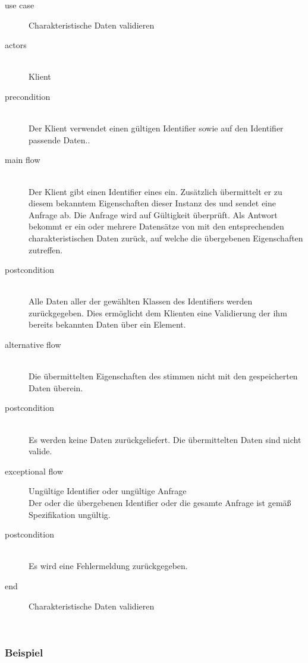 {\small

\begin{description}
     \item[use case] Charakteristische Daten validieren
     \item[  actors]~\\
     Klient
     \item[  precondition]~\\
     Der Klient verwendet einen gültigen Identifier sowie auf den Identifier passende Daten..
     \item[  main flow]~\\
     Der Klient gibt einen Identifier eines  ein. Zusätzlich übermittelt er zu diesem bekanntem  Eigenschaften dieser Instanz des  und sendet eine Anfrage ab. Die Anfrage wird auf Gültigkeit überprüft. Als Antwort bekommt er ein oder mehrere Datensätze von  mit den entsprechenden charakteristischen Daten zurück, auf welche die übergebenen Eigenschaften zutreffen. 
     \item[  postcondition]~\\
     Alle Daten aller  der gewählten Klassen des Identifiers werden zurückgegeben. Dies ermöglicht dem Klienten eine Validierung der ihm bereits bekannten Daten über ein Element.
      \item[  alternative flow]~\\
     Die übermittelten Eigenschaften des  stimmen nicht mit den gespeicherten Daten überein.
      \item[  postcondition]~\\
     Es werden keine Daten zurückgeliefert. Die übermittelten Daten sind nicht valide. 
      \item[  exceptional flow] Ungültige Identifier oder ungültige Anfrage ~\\
     Der oder die übergebenen Identifier oder die gesamte Anfrage ist gemäß Spezifikation ungültig.   
     \item[  postcondition]~\\
     Es wird eine Fehlermeldung zurückgegeben.   
     \item[end] Charakteristische Daten validieren
\end{description}

~\\

} %

\subsubsection{Beispiel}

